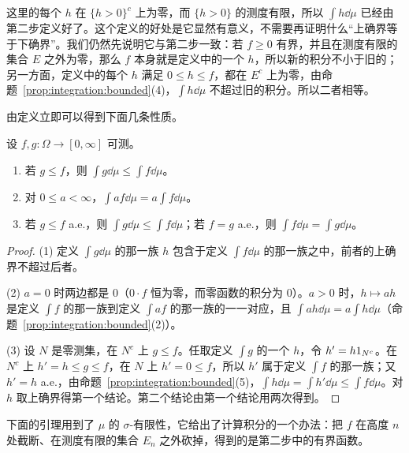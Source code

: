 这里的每个 $h$ 在 $\{h>0\}^c$ 上为零，而 $\{h>0\}$ 的测度有限，所以 $\int h\dd\mu$ 已经由第二步定义好了。这个定义的好处是它显然有意义，不需要再证明什么“上确界等于下确界”。我们仍然先说明它与第二步一致：若 $f\geqslant0$ 有界，并且在测度有限的集合 $E$ 之外为零，那么 $f$ 本身就是定义中的一个 $h$，所以新的积分不小于旧的；另一方面，定义中的每个 $h$ 满足 $0\leqslant h\leqslant f$，都在 $E^c$ 上为零，由命题~\ref{prop:integration:bounded}(4)，$\int h\dd\mu$ 不超过旧的积分。所以二者相等。

由定义立即可以得到下面几条性质。

\begin{proposition}\label{prop:integration:nonnegative-basic}
设 $f,g:\Omega\to[0,\infty]$ 可测。
\begin{enumerate}
\item 若 $g\leqslant f$，则 $\int g\dd\mu\leqslant\int f\dd\mu$。
\item 对 $0\leqslant a<\infty$，$\int af\dd\mu=a\int f\dd\mu$。
\item 若 $g\leqslant f$ a.e.，则 $\int g\dd\mu\leqslant\int f\dd\mu$；若 $f=g$ a.e.，则 $\int f\dd\mu=\int g\dd\mu$。
\end{enumerate}
\end{proposition}
\begin{proof}
(1) 定义 $\int g\dd\mu$ 的那一族 $h$ 包含于定义 $\int f\dd\mu$ 的那一族之中，前者的上确界不超过后者。

(2) $a=0$ 时两边都是 $0$（$0\cdot f$ 恒为零，而零函数的积分为 $0$）。$a>0$ 时，$h\mapsto ah$ 是定义 $\int f$ 的那一族到定义 $\int af$ 的那一族的一一对应，且 $\int ah\dd\mu=a\int h\dd\mu$（命题~\ref{prop:integration:bounded}(2)）。

(3) 设 $N$ 是零测集，在 $N^c$ 上 $g\leqslant f$。任取定义 $\int g$ 的一个 $h$，令 $h'=h1_{N^c}$。在 $N^c$ 上 $h'=h\leqslant g\leqslant f$，在 $N$ 上 $h'=0\leqslant f$，所以 $h'$ 属于定义 $\int f$ 的那一族；又 $h'=h$ a.e.，由命题~\ref{prop:integration:bounded}(5)，$\int h\dd\mu=\int h'\dd\mu\leqslant\int f\dd\mu$。对 $h$ 取上确界得第一个结论。第二个结论由第一个结论用两次得到。
\end{proof}

下面的引理用到了 $\mu$ 的 $\sigma$-有限性，它给出了计算积分的一个办法：把 $f$ 在高度 $n$ 处截断、在测度有限的集合 $E_n$ 之外砍掉，得到的是第二步中的有界函数。

